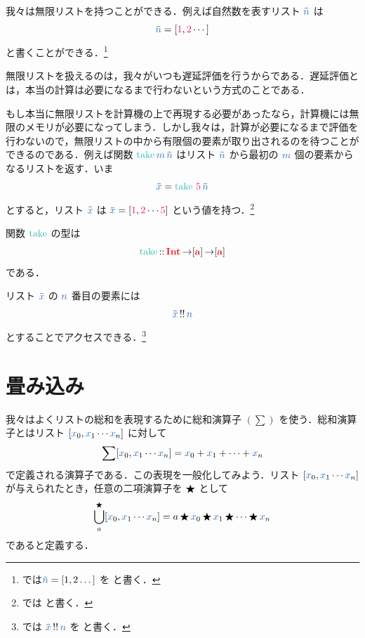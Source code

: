 \documentclass[a5paper,twoside,fleqn,draft]{jsbook}
\begin{document}
\separator

我々は無限リストを持つことができる．例えば自然数を表すリスト
$\hListVarWith{n}$ は
\begin{equation*}
  \hListVarWith{n}
  =\hListWith{\hConstant{1},\hConstant{2}\dotsb}
\end{equation*}
と書くことができる．\footnote{\haskell では$\hListVarWith{n}=\hListWith{1,2\dots}$ を  と書く．}

無限リストを扱えるのは，我々がいつも遅延評価を行うからである．遅延評価とは，本当の計算は必要になるまで行わないという方式のことである．

もし本当に無限リストを計算機の上で再現する必要があったなら，計算機には無限のメモリが必要になってしまう．しかし我々は，計算が必要になるまで評価を行わないので，無限リストの中から有限個の要素が取り出されるのを待つことができるのである．例えば関数 $\hTake\hVar{m}\,\hListVarWith{n}$ はリスト $\hListVarWith{n}$ から最初の $\hVar{m}$ 個の要素からなるリストを返す．いま
\begin{equation*}
  \hListVarWith{x}
  =\hTake\,\hConstant{5}\,\hListVarWith{n}
\end{equation*}
とすると，リスト $\hListVarWith{x}$ は $\hListVarWith{x}=[\hConstant{1},\hConstant{2}\dotsb\hConstant{5}]$ という値を持つ．\footnote{\haskell では  と書く．}

関数 $\hTake$ の型は
\begin{equation}
  \hTake
  \hIsTypeOf\hInt\hFunctionArrow\hListConstruct{\hTypeName{a}}\hFunctionArrow\hListConstruct{\hTypeName{a}}
\end{equation}
である．

\separator

リスト $\hListVarWith{x}$ の $\hVar{n}$ 番目の要素には
\begin{equation}
  \hListVarWith{x}\mListAt\hVar{n}
\end{equation}
とすることでアクセスできる．\footnote{\haskell では $\hListVarWith{x}\mListAt\hVar{n}$ を  と書く．}

\section{畳み込み}
\label{sec:convolution}

我々はよくリストの総和を表現するために総和演算子 $(\sum)$ を使う．総和演算子とはリスト $[\hVar{x}_0,\hVar{x}_1\dotsb\hVar{x}_n]$ に対して
\begin{equation}
  \sum[\hVar{x}_0,\hVar{x}_1\dotsb \hVar{x}_n]
  =\hVar{x}_0+\hVar{x}_1+\dotsb+\hVar{x}_n
\end{equation}
で定義される演算子である．この表現を一般化してみよう．リスト $[\hVar{x}_0,\hVar{x}_1\dotsb \hVar{x}_n]$ が与えられたとき，任意の二項演算子を $\operatorname{\bigstar}$ として
\begin{equation}
  \mFold^{\hAnyBinOp}_a[\hVar{x}_0,\hVar{x}_1\dotsb \hVar{x}_n]
  =a\hAnyBinOp \hVar{x}_0\hAnyBinOp \hVar{x}_1\hAnyBinOp\dotsb\hAnyBinOp \hVar{x}_n
\end{equation}
であると定義する．
\end{document}
